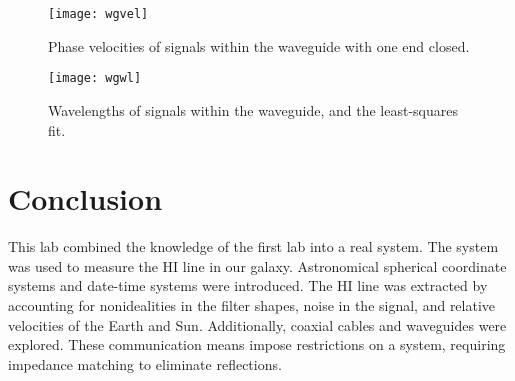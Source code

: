 \documentclass[12pt]{article}
\begin{document}
\begin{figure}
\centering
\texttt{[image: wgvel]}
\caption{Phase velocities of signals within the waveguide with one end closed.}
\label{fig:wgvel}
\end{figure}

\begin{figure}
\centering
\texttt{[image: wgwl]}
\caption{Wavelengths of signals within the waveguide, and the least-squares fit.}
\label{fig:wgwl}
\end{figure}

\section{Conclusion}
This lab combined the knowledge of the first lab into a real system.
The system was used to measure the HI line in our galaxy.
Astronomical spherical coordinate systems and date-time systems were introduced.
The HI line was extracted by accounting for nonidealities in the filter shapes, noise in the signal, and relative velocities of the Earth and Sun.
Additionally, coaxial cables and waveguides were explored.
These communication means impose restrictions on a system, requiring impedance matching to eliminate reflections.


\enddocument
\end{document}
